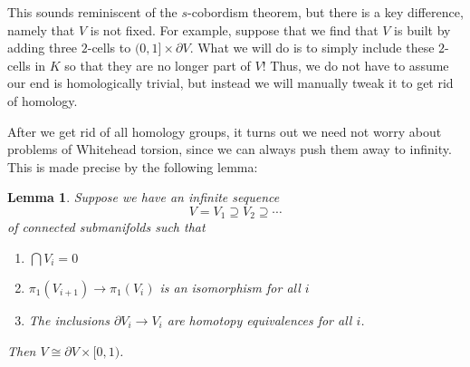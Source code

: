 \documentclass[a4paper, 12pt]{article}
\newtheorem{lemma}[thm]{Lemma}
\theoremstyle{definition}
\begin{document}
This sounds reminiscent of the $s$-cobordism theorem, but there is a key difference, namely that $V$ is not fixed. For example, suppose that we find that $V$ is built by adding three $2$-cells to $(0, 1] \times \partial V$. What we will do is to simply include these $2$-cells in $K$ so that they are no longer part of $V$! Thus, we do not have to assume our end is homologically trivial, but instead we will manually tweak it to get rid of homology.

After we get rid of all homology groups, it turns out we need not worry about problems of Whitehead torsion, since we can always push them away to infinity. This is made precise by the following lemma:
\begin{lemma}\label{lemma:end-simplify}
  Suppose we have an infinite sequence
  \[
    V = V_1 \supseteq V_2 \supseteq \cdots
  \]
  of connected submanifolds such that
  \begin{enumerate}
    \item $\bigcap V_i = 0$
    \item $\pi_1(V_{i + 1}) \to \pi_1(V_{i})$ is an isomorphism for all $i$
    \item The inclusions $\partial V_i \to V_i$ are homotopy equivalences for all $i$.
  \end{enumerate}
  Then $V \cong \partial V \times [0, 1)$.
\end{lemma}
\end{document}
